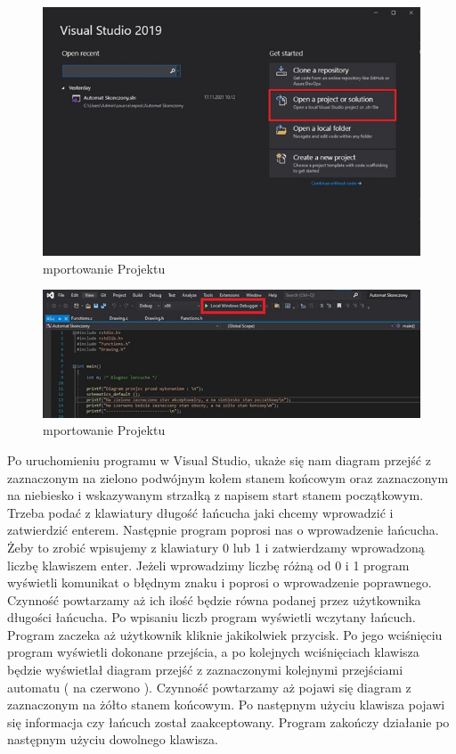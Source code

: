 \documentclass[10pt, a4paper]{report}
\begin{document}
    \begin{figure}[h]
        \begin{center}
            \includegraphics[scale=0.8]{photo2.jpg}
            \caption{mportowanie Projektu}
        \end{center}
    \end{figure}
    \newpage

    \begin{figure}[h]
        \begin{center}
            \includegraphics[scale=0.8]{photo3.jpg}
            \caption{mportowanie Projektu}
        \end{center}
    \end{figure}

    Po uruchomieniu programu w Visual Studio, ukaże się nam diagram przejść z zaznaczonym na zielono podwójnym kołem
    stanem końcowym oraz zaznaczonym na niebiesko i wskazywanym strzałką z napisem start stanem początkowym. Trzeba
    podać z klawiatury długość łańcucha jaki chcemy wprowadzić i zatwierdzić enterem. Następnie program poprosi nas o
    wprowadzenie łańcucha. Żeby to zrobić wpisujemy z klawiatury 0 lub 1 i zatwierdzamy wprowadzoną liczbę klawiszem enter.
    Jeżeli wprowadzimy liczbę różną od 0 i 1 program wyświetli komunikat o błędnym znaku i poprosi o wprowadzenie
    poprawnego. Czynność powtarzamy aż ich ilość będzie równa podanej przez użytkownika długości łańcucha. Po wpisaniu
    liczb program wyświetli wczytany łańcuch. Program zaczeka aż użytkownik kliknie jakikolwiek przycisk. Po jego wciśnięciu
    program wyświetli dokonane przejścia, a po kolejnych wciśnięciach klawisza będzie wyświetlał diagram przejść z
    zaznaczonymi kolejnymi przejściami automatu ( na czerwono ). Czynność powtarzamy aż pojawi się diagram z zaznaczonym
    na żółto stanem końcowym. Po następnym użyciu klawisza pojawi się informacja czy łańcuch został zaakceptowany. Program
    zakończy działanie po następnym użyciu dowolnego klawisza.
\end{document}
